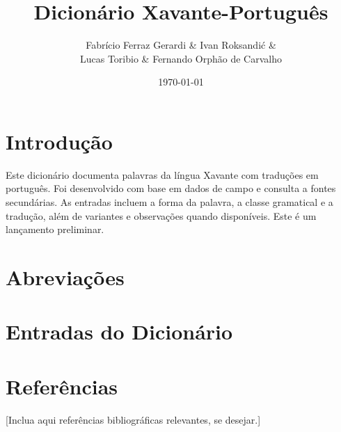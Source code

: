 \documentclass[12pt]{book}
\title{Dicionário Xavante-Português}
\author{Fabrício Ferraz Gerardi \& Ivan Roksandić \& \\ Lucas Toribio \& Fernando Orphão de Carvalho}
\date{\today}
\begin{document}
\frontmatter
\maketitle

\chapter*{Introdução}
Este dicionário documenta palavras da língua Xavante com traduções em português. Foi desenvolvido com base em dados de campo e consulta a fontes secundárias. As entradas incluem a forma da palavra, a classe gramatical e a tradução, além de variantes e observações quando disponíveis. Este é um lançamento preliminar.



\chapter*{Abreviações}


\tableofcontents

\mainmatter

\chapter*{Entradas do Dicionário}


\backmatter
\chapter*{Referências}
[Inclua aqui referências bibliográficas relevantes, se desejar.]
\end{document}
